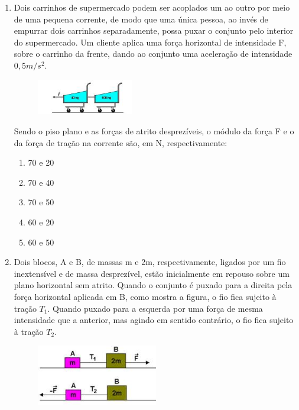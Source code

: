 \documentclass[12pt,letterpaper,fleqn]{article}
\begin{document}
\begin{itemize}
\begin{enumerate}
        \item Dois carrinhos de supermercado podem ser acoplados um ao outro por meio de uma pequena corrente, de modo que uma única pessoa, ao invés de empurrar dois carrinhos separadamente, possa puxar o conjunto pelo interior do supermercado. Um cliente aplica uma força horizontal de intensidade F, sobre o carrinho da frente, dando ao conjunto uma aceleração de intensidade $0,5 m/s^2$.
        \begin{figure}[h]
            \centering
            \includegraphics[width=0.4\textwidth]{ex_11.jpg}
        \end{figure}
        
        Sendo o piso plano e as forças de atrito desprezíveis, o módulo da força F e o da força de tração na corrente são, em N, respectivamente:
        \begin{enumerate}
            \item 70 e 20
            \item 70 e 40
            \item 70 e 50
            \item 60 e 20
            \item 60 e 50
        \end{enumerate}
        
        \item Dois blocos, A e B, de massas m e 2m, respectivamente, ligados por um fio inextensível e de massa desprezível, estão inicialmente em repouso sobre um plano horizontal sem atrito. Quando o conjunto é puxado para a direita pela força horizontal  aplicada em B, como mostra a figura, o fio fica sujeito à tração $T_1$. Quando puxado para a esquerda por uma força de mesma intensidade que a anterior, mas agindo em sentido contrário, o fio fica sujeito à tração $T_2$.
        \begin{figure}[h]
            \centering
            \includegraphics[width=0.5\textwidth]{ex_12.jpg}
        \end{figure}
        

\end{enumerate}
\end{itemize}
\end{document}
